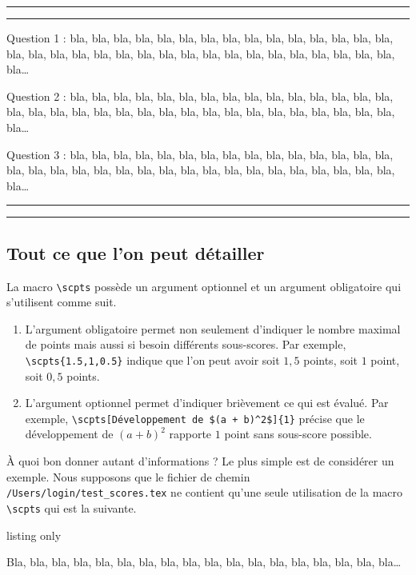 \documentclass[12pt,a4paper]{scrartcl}
\makeatletter
\newcommand\@example@start@end[2]{%
        \par\smallskip
        \begingroup%
            \centering%
            \setlength{\fboxrule}{0.7pt}%
            \rule[0.4ex]{#2}{0.7pt}%
            \framebox{\footnotesize\vphantom{pE}Mise en forme - #1}%
            \rule[0.4ex]{#2}{0.7pt}%
            \par\smallskip
        \endgroup%
    }
\newcommand\examplestart{
        \color{-red!75!green!50}
        \@example@start@end{Début}{5em}
    }
\newcommand\exampleend{
        \@example@start@end{Fin}{5.5em}
        \color{black}
    }
\theoremstyle{definition}
\makeatother
\begin{document}
\examplestart{}
 Question 1 : bla, bla, bla, bla, bla, bla, bla, bla, bla, bla,
bla, bla, bla, bla, bla, bla, bla, bla, bla, bla, bla, bla, bla, bla, bla,
bla, bla, bla, bla, bla, bla, bla, bla, bla\dots

 Question 2 : bla, bla, bla, bla, bla, bla, bla, bla, bla, bla, 
bla, bla, bla, bla, bla, bla, bla, bla, bla, bla, bla, bla, bla, bla, bla,
bla, bla, bla, bla, bla, bla, bla, bla, bla\dots

 Question 3 : bla, bla, bla, bla, bla, bla, bla, bla, bla, bla, 
bla, bla, bla, bla, bla, bla, bla, bla, bla, bla, bla, bla, bla, bla, bla,
bla, bla, bla, bla, bla, bla, bla, bla, bla\dots
\exampleend{}



    \subsection{Tout ce que l'on peut détailler}

La macro \verb+\scpts+ possède un argument optionnel et un argument obligatoire qui s'utilisent comme suit.
\begin{enumerate}
	\item L'argument obligatoire permet non seulement d'indiquer le nombre maximal de points mais aussi si besoin différents sous-scores.
	Par exemple, \verb+\scpts{1.5,1,0.5}+ indique que l'on peut avoir soit $1,\!5$ points, soit $1$ point, soit $0,\!5$ points.

	\item L'argument optionnel permet d'indiquer brièvement ce qui est évalué.
	Par exemple, \verb&\scpts[Développement de $(a + b)^2$]{1}& précise que le développement de $(a + b)^2$ rapporte $1$ point sans sous-score possible.
\end{enumerate}


\medskip

À quoi bon donner autant d'informations ? Le plus simple est de considérer un exemple.
Nous supposons que le fichier de chemin \verb+/Users/login/test_scores.tex+ ne contient qu'une seule utilisation de la macro \verb+\scpts+ qui est la suivante.

\begin{tcblisting}{listing only}
\exercise

 Bla, bla, bla, bla, bla, bla, bla, bla, bla,
bla, bla, bla, bla, bla, bla, bla, bla, bla\dots
\end{tcblisting}
\end{document}
